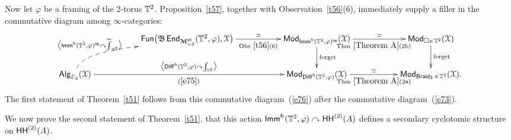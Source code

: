 \documentclass{amsart}
\theoremstyle{definition}
\theoremstyle{remark}
\DeclareMathOperator{\Alg}{\sf Alg}
\DeclareMathOperator{\Mod}{\sf Mod}
\DeclareMathOperator{\End}{\sf End}
\DeclareMathOperator{\Fun}{{\sf Fun}}
\newcommand{\lacts}{\curvearrowright}
\DeclareMathOperator{\Diff}{{\sf Diff}}
\DeclareMathOperator{\op}{\mathsf{op}}
\DeclareMathOperator{\fr}{\sf fr}
\DeclareMathOperator{\sfr}{\sf sfr}
\newcommand{\lag}{\langle}
\newcommand{\rag}{\rangle}
\newcommand{\w}{\widetilde}
\def\cE{\mathcal E}\def\cF{\mathcal F}\def\cG{\mathcal G}\def\cH{\mathcal H}
\def\bcM{\boldsymbol{\mathcal M}}\def\bcN{\boldsymbol{\mathcal N}}\def\bcO{\boldsymbol{\mathcal O}}\def\bcP{\boldsymbol{\mathcal P}}\def\bcQ{\boldsymbol{\mathcal Q}}\def\bcR{\boldsymbol{\mathcal R}}
\def\bcM{\boldsymbol{\mathcal M}}
\DeclareMathOperator{\Braid}{{\sf Braid}_3}
\DeclareMathOperator{\HHt}{{\sf HH}^{(2)}}
\DeclareMathOperator{\Imm}{\sf Imm}
\begin{document}
Now let $\varphi$ be a framing of the 2-torus $\mathbb T^2$.
Proposition~\ref{t57}, together with Observation~\ref{t56}(6), immediately supply a filler in the commutative diagram among $\infty$-categories:
\begin{equation}
\label{e76}
\xymatrix{
&&
\Fun\bigl( \fB \End_{\bcM_{=2}^{\sfr}}(\TT^2,\varphi) , \cX \bigr)
\ar[rr]^-{\simeq}_-{\rm Obs~\ref{t56}(6)}
&&
\Mod_{\Imm^{\fr}(\TT^2,\varphi)^{\op}}(\cX)
\ar[d]^-{\rm forget}
\ar[rr]^-{\simeq}_{\rm Thm~\ref{Theorem A}(2b)}
&&
\Mod_{\square \ltimes \TT^2}(\cX)
\ar[d]^-{\rm forget}
\\
\Alg_{\cE_2}(\cX)
\ar[rrrr]^-{\bigl \lag \Diff^{\fr}(\TT^2,\varphi) \lacts \int_{\TT^2} \bigr \rag}_-{(\ref{e75})}
\ar@(u,-)@{-->}[urr]^-{\bigl \lag \Imm^{\fr}(\TT^2,\varphi)^{\op} \lacts  \w{\int}_{\TT^2} \bigr \rag}
&&
&&
\Mod_{\Diff^{\fr}(\TT^2,\varphi)}(\cX)
\ar[rr]^-{\simeq}_{\rm Thm~\ref{Theorem A}(2a)}
&&
\Mod_{\Braid \ltimes \TT^2}(\cX)
.
}
\end{equation}
The first statement of Theorem~\ref{t51} follows from this commutative diagram~(\ref{e76})
after the commutative diagram~(\ref{e73}). 


{\color{magenta}

We now prove the second statement of Theorem~\ref{t51}, that this action $\Imm^{\fr}(\TT^2,\varphi)\lacts \HHt(A)$ defines a secondary cyclotomic structure on $\HHt(A)$.  

}

\end{document}
